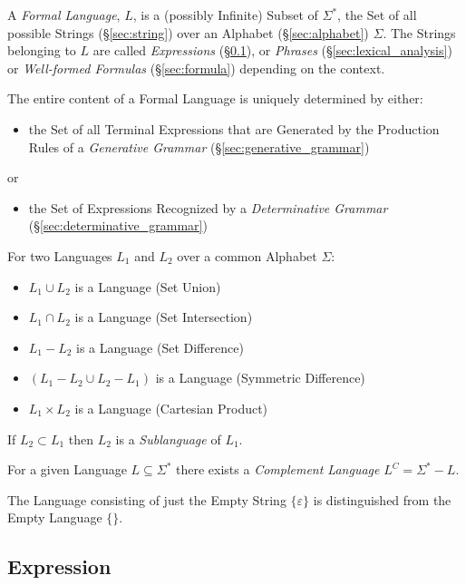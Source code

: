 A \emph{Formal Language}, $L$, is a (possibly Infinite) Subset of
$\Sigma^*$, the Set of all possible Strings (\S\ref{sec:string}) over
an Alphabet (\S\ref{sec:alphabet}) $\Sigma$. The Strings belonging to
$L$ are called \emph{Expressions} (\S\ref{sec:expression}), or
\emph{Phrases} (\S\ref{sec:lexical_analysis}) or \emph{Well-formed
  Formulas} (\S\ref{sec:formula}) depending on the context.

The entire content of a Formal Language is uniquely determined by
either:
\begin{itemize}
  \item the Set of all Terminal Expressions that are Generated by the
    Production Rules of a \emph{Generative Grammar}
    (\S\ref{sec:generative_grammar})
\end{itemize}
or
\begin{itemize}
  \item the Set of Expressions Recognized by a \emph{Determinative
    Grammar} (\S\ref{sec:determinative_grammar})
\end{itemize}

For two Languages $L_1$ and $L_2$ over a common Alphabet $\Sigma$:
\begin{itemize}
  \item $L_1 \cup L_2$ is a Language (Set Union)
  \item $L_1 \cap L_2$ is a Language (Set Intersection)
  \item $L_1 - L_2$ is a Language (Set Difference)
  \item $(L_1 - L_2 \cup L_2 - L_1)$ is a Language (Symmetric Difference)
  \item $L_1 \times L_2$ is a Language (Cartesian Product)
\end{itemize}
If $L_2 \subset L_1$ then $L_2$ is a \emph{Sublanguage} of $L_1$.

For a given Language $L \subseteq \Sigma^*$ there exists a
\emph{Complement Language} $L^C = \Sigma^* - L$.

The Language consisting of just the Empty String $\{\varepsilon\}$ is
distinguished from the Empty Language $\{\}$.



\subsection{Expression}\label{sec:expression}

